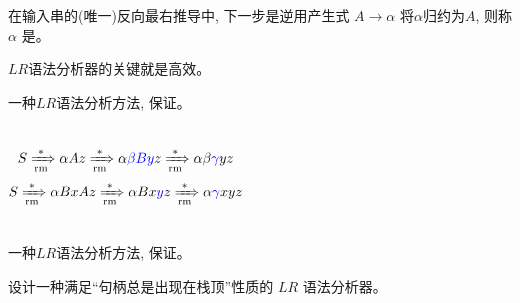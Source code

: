 \begin{frame}{}
  \begin{center}

    \begin{definition}[句柄 (Handle)]
      在输入串的(唯一)反向最右推导中, 下一步是逆用产生式 $A \to \alpha$
      将$\alpha$归约为$A$, 则称 $\alpha$ 是。
    \end{definition}

    \vspace{0.50cm}

    \vspace{0.30cm}
    $LR$语法分析器的关键就是高效。
  \end{center}
\end{frame}

\begin{frame}{}
  \begin{center}

    \begin{theorem}
      一种$LR$语法分析方法, 保证。
    \end{theorem}

    \pause

    \vspace{-0.30cm}
    \begin{columns}
        \[
          S \xRightarrow[\text{rm}]{\ast} \alpha Az \xRightarrow[\text{rm}]{\ast} \alpha\textcolor{blue}{\beta By}z
            \xRightarrow[\text{rm}]{\ast} \alpha\beta\textcolor{blue}{\gamma} yz
        \]
        \[
          S \xRightarrow[\text{rm}]{\ast} \alpha BxAz \xRightarrow[\text{rm}]{\ast} \alpha Bx\textcolor{blue}{y}z \xRightarrow[\text{rm}]{\ast} \alpha\textcolor{blue}{\gamma} xyz
        \]
    \end{columns}
  \end{center}
\end{frame}

\begin{frame}{}
  \begin{center}

    \begin{theorem}
      一种$LR$语法分析方法, 保证。
    \end{theorem}

    \pause
    \vspace{0.80cm}
    设计一种满足``句柄总是出现在栈顶''性质的 $LR$ 语法分析器。
  \end{center}
\end{frame}

